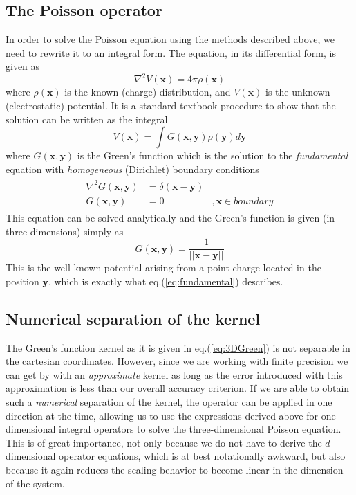 \subsection{The Poisson operator}
In order to solve the Poisson equation using the methods described above, we
need to rewrite it to an integral form. The equation, in its differential
form, is given as
\begin{equation}
	\nabla^2 V(\boldsymbol{x}) = 4\pi\rho(\boldsymbol{x})
\end{equation}
where $\rho(\boldsymbol{x})$ is the known (charge) distribution, and
$V(\boldsymbol{x})$ is the unknown (electrostatic) potential. It is a standard
textbook procedure to show that the solution can be written as the integral
\begin{equation}
	V(\boldsymbol{x}) = \int G(\boldsymbol{x},\boldsymbol{y})
								\rho(\boldsymbol{y})d\boldsymbol{y}
\end{equation}
where $G(\boldsymbol{x},\boldsymbol{y})$ is the Green's function which
is the solution to the \emph{fundamental} equation with \emph{homogeneous}
(Dirichlet) boundary conditions
\begin{eqnarray}
	\label{eq:fundamental}
	\begin{split}
	\nabla^2 G(\boldsymbol{x},\boldsymbol{y}) &=
								\delta(\boldsymbol{x}-\boldsymbol{y})&\\
	G(\boldsymbol{x},\boldsymbol{y}) &= 0 &,\boldsymbol{x} \in boundary
	\end{split}
\end{eqnarray}
This equation can be solved analytically and the Green's function is given
(in three dimensions) simply as
\begin{equation}
	\label{eq:3DGreen}
	G(\boldsymbol{x},\boldsymbol{y}) =
						\frac{1}{||\boldsymbol{x}-\boldsymbol{y}||}
\end{equation}
This is the well known potential arising from a point charge located in the 
position $\boldsymbol{y}$, which is exactly what eq.(\ref{eq:fundamental})
describes.\\

\subsection*{Numerical separation of the kernel}
The Green's function kernel as it is given in eq.(\ref{eq:3DGreen}) is not 
separable in the cartesian coordinates. However, since we are working with
finite precision we can get by with an \emph{approximate} kernel as long as
the error introduced with this approximation is less than our overall accuracy
criterion. If we are able to obtain such a \emph{numerical} separation of the
kernel, the operator can be applied in one direction at the time, allowing us 
to use the expressions derived above for one-dimensional integral operators to 
solve the three-dimensional Poisson equation. This is of great importance, not 
only because we do not have to derive the $d$-dimensional operator equations, 
which is at best notationally awkward, but also because it again reduces the 
scaling behavior to become linear in the dimension of the system.\\

